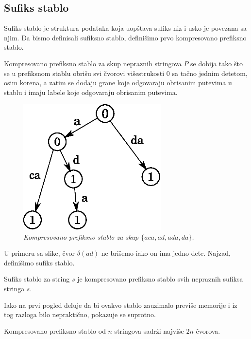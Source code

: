 \subsection{Sufiks stablo}

Sufiks stablo je struktura podataka koja uop\v stava sufiks niz i usko je povezana sa njim. Da bismo definisali sufiksno stablo, defini\v simo prvo kompresovano prefiksno stablo.

\begin{dfn}
Kompresovano prefiksno stablo za skup nepraznih stringova $P$ se dobija tako \v sto se u prefiksnom stablu obri\v su svi \v cvorovi vi\v sestrukosti $0$ sa ta\v cno jednim detetom, osim korena, a zatim se dodaju grane koje odgovaraju obrisanim putevima u stablu i imaju labele koje odgovaraju obrisanim putevima.
\end{dfn}

\begin{figure}[H]
    \centering
    \includegraphics[width=75mm]{../img/ztrie1.eps}
    \caption*{\textit{Kompresovano prefiksno stablo za skup $\{aca,ad,ada,da\}$.}}
\end{figure}

U primeru sa slike, \v cvor $\delta(ad)$ ne bri\v semo iako on ima jedno dete. Najzad, defini\v simo sufiks stablo.

\begin{dfn}
Sufiks stablo za string $s$ je kompresovano prefiksno stablo svih nepraznih sufiksa stringa $s$.
\end{dfn}

Iako na prvi pogled deluje da bi ovakvo stablo zauzimalo previ\v se memorije i iz tog razloga bilo neprakti\v cno, pokazuje se suprotno.

\begin{thm}
Kompresovano prefiksno stablo od $n$ stringova sadr\v zi najvi\v se $2n$ \v cvorova. 
\end{thm}


